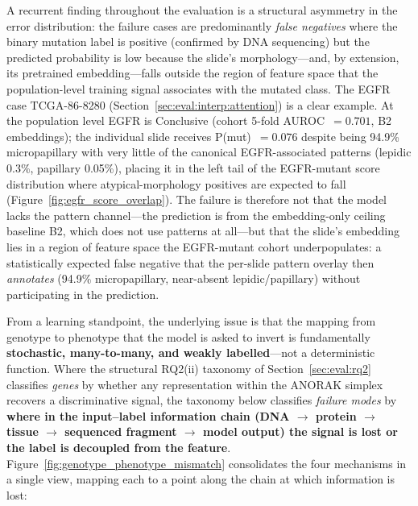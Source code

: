 A recurrent finding throughout the evaluation is a structural
asymmetry in the error distribution: the failure cases are
predominantly \emph{false negatives} where the binary mutation
label is positive (confirmed by DNA sequencing) but the predicted
probability is low because the slide's morphology---and, by
extension, its pretrained embedding---falls outside the region of
feature space that the population-level training signal associates
with the mutated class.
The EGFR case TCGA-86-8280 (Section~\ref{sec:eval:interp:attention})
is a clear example.
At the population level EGFR is Conclusive (cohort 5-fold
AUROC~$= 0.701$, B2 embeddings); the individual slide receives
P(mut)~$= 0.076$ despite being 94.9\% micropapillary with very
little of the canonical EGFR-associated patterns (lepidic 0.3\%,
papillary 0.05\%), placing it in the left tail of the
EGFR-mutant score distribution where atypical-morphology positives
are expected to fall (Figure~\ref{fig:egfr_score_overlap}).
The failure is therefore not that the model lacks the pattern
channel---the prediction is from the embedding-only ceiling
baseline B2, which does not use patterns at all---but that the
slide's embedding lies in a region of feature space the
EGFR-mutant cohort underpopulates: a statistically expected
false negative that the per-slide pattern overlay then
\emph{annotates} (94.9\% micropapillary, near-absent
lepidic/papillary) without participating in the prediction.

From a learning standpoint, the underlying issue is that the
mapping from genotype to phenotype that the model is asked to
invert is fundamentally \textbf{stochastic, many-to-many, and
weakly labelled}---not a deterministic function.
Where the structural RQ2(ii) taxonomy of
Section~\ref{sec:eval:rq2} classifies \emph{genes} by whether any
representation within the ANORAK simplex recovers a discriminative
signal, the taxonomy below classifies \emph{failure modes} by
\textbf{where in the input--label information chain
(DNA $\rightarrow$ protein $\rightarrow$ tissue $\rightarrow$
sequenced fragment $\rightarrow$ model output) the signal is
lost or the label is decoupled from the feature}.
Figure~\ref{fig:genotype_phenotype_mismatch} consolidates the four
mechanisms in a single view, mapping each to a point along the
chain at which information is lost:

